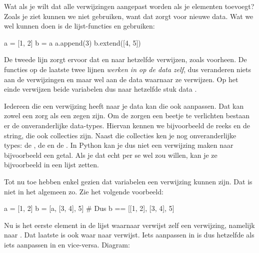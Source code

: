   Wat als je wilt dat alle verwijzingen aangepast worden als je elementen
  toevoegt? Zoals je ziet kunnen we \py{+} niet gebruiken, want dat zorgt voor
  nieuwe data. Wat we wel kunnen doen is de lijst-functies  en
   gebruiken:
  \begin{python}
    a = [1, 2]
    b = a
    a.append(3)
    b.extend([4, 5])
  \end{python}
  De tweede lijn zorgt ervoor dat  en  naar hetzelfde verwijzen,
  zoals voorheen. De functies op de laatste twee lijnen \emph{werken in op de
    data zelf}, dus veranderen niets aan de verwijzingen  en  maar
  wel aan de data waarnaar ze verwijzen. Op het einde verwijzen beide variabelen
  dus naar hetzelfde stuk data \py{[1, 2, 3, 4, 5]}.

  Iedereen die een verwijzing heeft naar je data kan die ook aanpassen. Dat kan
  zowel een zorg als een zegen zijn. Om de zorgen een beetje te verlichten
  bestaan er de onveranderlijke data-types. Hiervan kennen we bijvoorbeeld de
  reeks en de string, die ook collecties zijn. Naast die collecties
  ken je nog onveranderlijke types: de , de  en de .
  In Python kan je dus niet een verwijzing maken naar bijvoorbeeld een getal.
  Als je dat echt per se wel zou willen, kan je ze bijvoorbeeld in een lijst
  zetten.

  Tot nu toe hebben enkel gezien dat variabelen een verwijzing kunnen zijn. Dat
  is niet in het algemeen zo. Zie het volgende voorbeeld:
  \begin{python}
    a = [1, 2]
    b = [a, [3, 4], 5] # Dus b == [[1, 2], [3, 4], 5]
  \end{python}
  Nu is het eerste element in de lijst waarnaar  verwijst zelf een
  verwijzing, namelijk naar \py{[1, 2]}. Dat laatste is ook waar  naar
  verwijst. Iets aanpassen in  is dus hetzelfde als iets aanpassen in
   en vice-versa. Diagram:
    \begin{center}
  \end{center}

